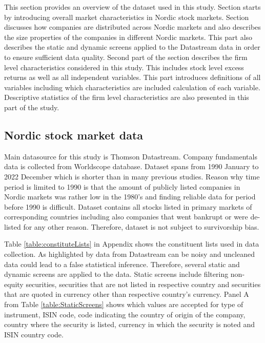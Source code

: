 \documentclass[12pt]{article}
\begin{document}
This section provides an overview of the dataset used in this study. Section starts by introducing overall market characteristics in Nordic stock markets. Section discusses how companies are distributed across Nordic markets and also describes the size properties of the companies in different Nordic markets. This part also describes the static and dynamic screens applied to the Datastream data in order to ensure sufficient data quality. Second part of the section describes the firm level characteristics considered in this study. This includes stock level excess returns as well as all independent variables. This part introduces definitions of all variables including which characteristics are included calculation of each variable. Descriptive statistics of the firm level characteristics are also presented in this part of the study. \par

\subsection{Nordic stock market data}\label{NordicStockMarketData}

Main datasource for this study is Thomson Datastream. Company fundamentals data is collected from Worldscope database. Dataset spans from 1990 January to 2022 December which is shorter than in many previous studies. Reason why time period is limited to 1990 is that the amount of publicly listed companies in Nordic markets was rather low in the 1980's and finding reliable data for period before 1990 is difficult. Dataset contains all stocks listed in primary markets of corresponding countries including also companies that went bankrupt or were de-listed for any other reason. Therefore, dataset is not subject to survivorship bias. \par

Table \ref{table:constituteLists} in Appendix shows the constituent lists used in data collection. As highlighted by \citet{Ince2006} data from Datastream can be noisy and uncleaned data could lead to a false statistical inference. Therefore, several static and dynamic screens are applied to the data. Static screens include filtering non-equity securities, securities that are not listed in respective country and securities that are quoted in currency other than respective country's currency. Panel A from Table \ref{table:StaticScreens} shows which values are accepted for type of instrument, ISIN code, code indicating the country of origin of the company, country where the security is listed, currency in which the security is noted and ISIN country code. \par
\end{document}
